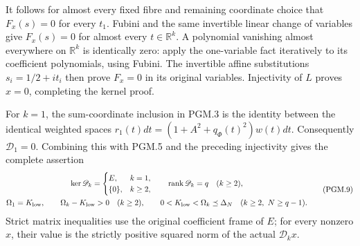 It follows for almost every fixed fibre and remaining coordinate
choice that \(F_x(s)=0\) for every \(t_1\). Fubini and the same
invertible linear change of variables give \(F_x(s)=0\) for
almost every \(t\in\mathbb{R}^k\). A polynomial vanishing almost
everywhere on \(\mathbb{R}^k\) is identically zero: apply the
one-variable fact iteratively to its coefficient polynomials,
using Fubini. The invertible affine substitutions
\(s_i=1/2+it_i\) then prove \(F_x=0\) in its original variables.
Injectivity of \(L\) proves \(x=0\), completing the kernel proof.

For \(k=1\), the sum-coordinate inclusion in PGM.3 is the
identity between the identical weighted spaces
\(r_1(t)dt=(1+A^2+q_\Phi(t)^2)w(t)dt\).
Consequently \(\mathscr D_1=0\). Combining this with PGM.5
and the preceding injectivity gives the complete assertion
\[
\begin{gathered}
 \ker\mathscr D_k=
 \begin{cases}E,&k=1,\\ \{0\},&k\geq2,\end{cases}
 \qquad
 \operatorname{rank}\mathscr D_k=q\quad(k\geq2),\\
 \Omega_1=K_{\rm low},\qquad
 \Omega_k-K_{\rm low}>0\quad(k\geq2),\qquad
 0<K_{\rm low}<\Omega_k\preceq\Delta_N
          \quad(k\geq2,\ N\geq q-1).
\end{gathered}
\tag{PGM.9}\label{GraphV2:eq:pgm-strict}
\]
Strict matrix inequalities use the original coefficient frame of
\(E\); for every nonzero \(x\), their value is the strictly
positive squared norm of the actual \(\mathscr D_kx\).

